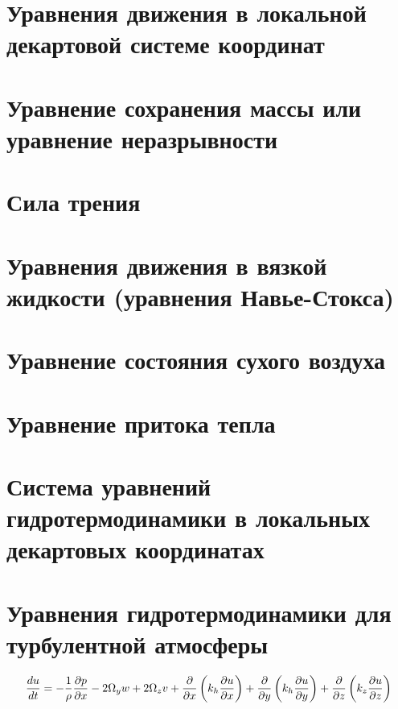 \section{{\color{noone} Уравнения движения в локальной декартовой системе координат}}
    \lipsum[1-2]

\section{Уравнение сохранения массы или уравнение неразрывности}
    \lipsum[1-2]

\section{Сила трения}
    \lipsum[1-2]

\section{Уравнения движения в вязкой жидкости (уравнения Навье-Стокса)}
    \lipsum[1-2]

\section{Уравнение состояния сухого воздуха}
    \lipsum[1-2]

\section{Уравнение притока тепла}
    \lipsum[1-2]

\section{Система уравнений гидротермодинамики в локальных декартовых координатах}
    \lipsum[1-2]

\section{Уравнения гидротермодинамики для турбулентной атмосферы}

\begin{equation}
\label{mom_conserv_turb_u}
    \displaystyle\frac{d u}{d t} = -\frac{1}{\rho}\displaystyle\frac{\partial p}{\partial x} - 2\Omega_yw + 2\Omega_zv + 
    \frac{\partial}{\partial x} \left( k_h \displaystyle\frac{\partial u}{\partial x} \right) + 
    \frac{\partial}{\partial y} \left( k_h \displaystyle\frac{\partial u}{\partial y} \right) + 
    \frac{\partial}{\partial z} \left( k_z \displaystyle\frac{\partial u}{\partial z} \right)
\end{equation}

